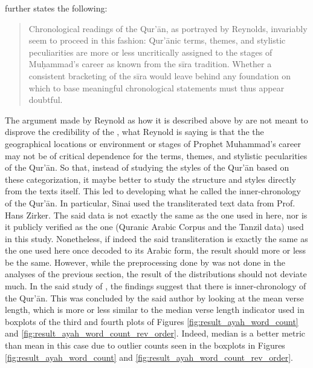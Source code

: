 \noindent{} further states the following:

\begin{quotation}
    Chronological readings of the Qur'\=an, as portrayed by Reynolds, invariably
    seem to proceed in this fashion: Qur'\=anic terms, themes, and stylistic peculiarities are
    more or less uncritically assigned to the stages of Muḥammad's  career as known from
    the sīra tradition. Whether a consistent bracketing of the sīra would leave behind any
    foundation on which to base meaningful chronological statements must thus appear
    doubtful.
\end{quotation}

The argument made by Reynold as how it is described above by \cite{sinai2020oqs} are not meant to disprove the credibility of the  , what Reynold is saying is that the the geographical locations or environment or stages of Prophet Muhammad's  career may not be of critical dependence for the terms, themes, and stylistic pecularities of the Qur'\=an. So that, instead of studying the styles of the Qur'\=an based on these categorization, it maybe better to study the structure and styles directly from the texts itself. This led \cite{sinai2020oqs} to developing what he called the inner-chronology of the Qur'\=an. In particular, Sinai used the transliterated text data from Prof. Hans Zirker. The said data is not exactly the same as the one used in here, nor is it publicly verified as the one (Quranic Arabic Corpus and the Tanzil data) used in this study. Nonetheless, if indeed the said transliteration is exactly the same as the one used here once decoded to its Arabic form, the result should more or less be the same. However, while the preprocessing done by  was not done in the analyses of the previous section, the result of the distributions should not deviate much. In the said study of , the findings suggest that there is inner-chronology of the Qur'\=an. This was concluded by the said author by looking at the mean verse length, which is more or less similar to the median verse length indicator used in boxplots of the third and fourth plots of Figures \ref{fig:result_ayah_word_count} and \ref{fig:result_ayah_word_count_rev_order}. Indeed, median is a better metric than mean in this case due to outlier counts seen in the boxplots in Figures \ref{fig:result_ayah_word_count} and \ref{fig:result_ayah_word_count_rev_order}.

